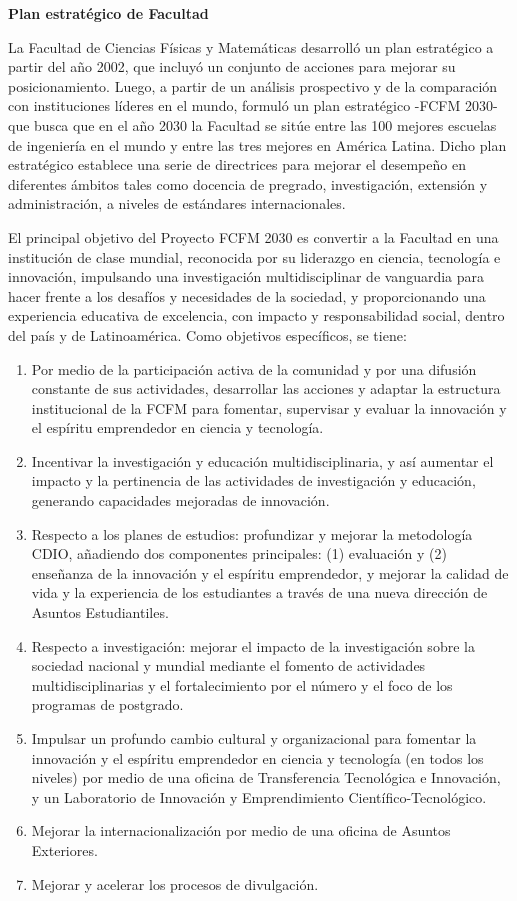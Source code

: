 \textbf{Plan estratégico de Facultad}

La Facultad de Ciencias Físicas y Matemáticas desarrolló un plan estratégico a partir del año 2002, que incluyó un conjunto de acciones para mejorar su posicionamiento. Luego, a partir de un análisis prospectivo y de la comparación con instituciones líderes en el mundo, formuló un plan estratégico -FCFM 2030- que busca que en el año 2030 la Facultad se sitúe entre las 100 mejores escuelas de ingeniería en el mundo y entre las tres mejores en América Latina. Dicho plan estratégico establece una serie de directrices para mejorar el desempeño en diferentes ámbitos tales como docencia de pregrado, investigación, extensión y administración, a niveles de estándares internacionales. 

El principal objetivo del Proyecto FCFM 2030 es convertir a la Facultad en una institución de clase mundial, reconocida por su liderazgo en ciencia, tecnología e innovación, impulsando una investigación multidisciplinar de vanguardia para hacer frente a los desafíos y necesidades de la sociedad, y proporcionando una experiencia educativa de excelencia, con impacto y responsabilidad social, dentro del país y de Latinoamérica. Como objetivos específicos, se tiene:

\begin{enumerate}
\item Por medio de la participación activa de la comunidad y por una difusión constante de sus actividades, desarrollar las acciones y adaptar la estructura institucional de la FCFM para fomentar, supervisar y evaluar la innovación y el espíritu emprendedor en ciencia y tecnología.
\item Incentivar la investigación y educación multidisciplinaria, y así aumentar el impacto y la pertinencia de las actividades de investigación y educación, generando capacidades mejoradas de innovación.
\item Respecto a los planes de estudios: profundizar y mejorar la metodología CDIO, añadiendo dos componentes principales: (1) evaluación y (2) enseñanza de la innovación y el espíritu emprendedor, y mejorar la calidad de vida y la experiencia de los estudiantes a través de una nueva dirección de Asuntos Estudiantiles.
\item Respecto a investigación: mejorar el impacto de la investigación sobre la sociedad nacional y mundial mediante el fomento de actividades multidisciplinarias y el fortalecimiento por el número y el foco de los programas de postgrado.
\item Impulsar un profundo cambio cultural y organizacional para fomentar la innovación y el espíritu emprendedor en ciencia y tecnología (en todos los niveles) por medio de una oficina de Transferencia Tecnológica e Innovación, y un Laboratorio de Innovación y Emprendimiento Científico-Tecnológico.
\item Mejorar la internacionalización por medio de una oficina de Asuntos Exteriores.
\item Mejorar y acelerar los procesos de divulgación.
\end{enumerate}
